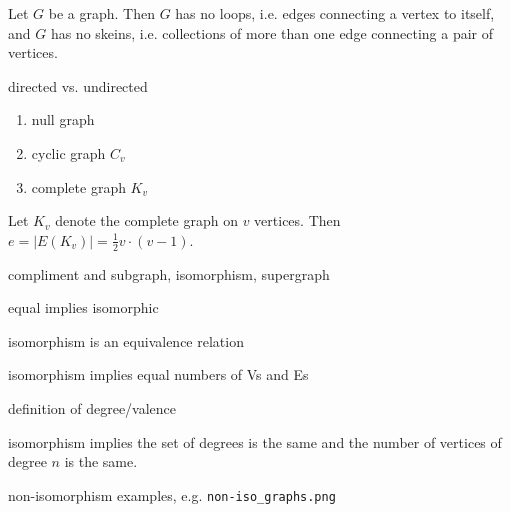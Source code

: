 \begin{lemma} Let $G$ be a graph.  Then $G$ has no \textnormal{loops, i.e.} edges connecting a vertex to itself, and $G$ has no \textnormal{skeins, i.e.} collections of more than one edge connecting a pair of vertices.
\end{lemma}

{\color{red} directed vs. undirected}

\begin{example}
    \begin{enumerate}
        \item null graph
        \item cyclic graph $C_v$
        \item complete graph $K_v$
    \end{enumerate}
\end{example}

\begin{theorem} \label{thm:edges_in_Kv} Let $K_v$ denote the complete graph on $v$ vertices.  Then $e=|E(K_v)|= \frac{1}{2} v \cdot (v-1)$.
\end{theorem}

\begin{definition} compliment and subgraph, isomorphism, supergraph
\end{definition}

equal implies isomorphic

isomorphism is an equivalence relation

isomorphism implies equal numbers of Vs and Es

definition of degree/valence

isomorphism implies the set of degrees is the same and the number of vertices of degree $n$ is the same.

non-isomorphism examples, e.g. \verb|non-iso_graphs.png| \label{ex:non-iso_graphs}

